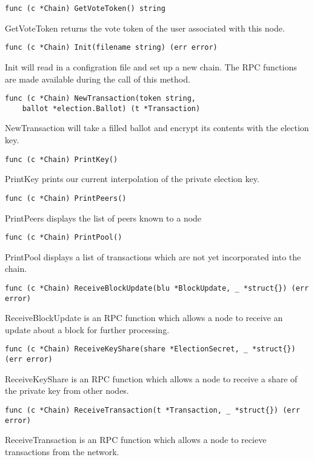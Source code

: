 \documentclass[a4paper,12pt]{article}
\begin{document}
\begin{Verbatim}[obeytabs,tabsize=4]
func (c *Chain) GetVoteToken() string
\end{Verbatim}
GetVoteToken returns the vote token of the user associated with this node.

\begin{Verbatim}[obeytabs,tabsize=4]
func (c *Chain) Init(filename string) (err error)
\end{Verbatim}
Init will read in a configration file and set up a new chain. The RPC functions are made available during the call of this method.

\begin{Verbatim}[obeytabs,tabsize=4]
func (c *Chain) NewTransaction(token string,
    ballot *election.Ballot) (t *Transaction)
\end{Verbatim}
NewTransaction will take a filled ballot and encrypt its contents with the election key.

\begin{Verbatim}[obeytabs,tabsize=4]
func (c *Chain) PrintKey()
\end{Verbatim}
PrintKey prints our current interpolation of the private election key.

\begin{Verbatim}[obeytabs,tabsize=4]
func (c *Chain) PrintPeers()
\end{Verbatim}
PrintPeers displays the list of peers known to a node

\begin{Verbatim}[obeytabs,tabsize=4]
func (c *Chain) PrintPool()
\end{Verbatim}
PrintPool displays a list of transactions which are not yet incorporated into the chain.

\begin{Verbatim}[obeytabs,tabsize=4]
func (c *Chain) ReceiveBlockUpdate(blu *BlockUpdate, _ *struct{}) (err error)
\end{Verbatim}
ReceiveBlockUpdate is an RPC function which allows a node to receive an update about a block for further processing.

\begin{Verbatim}[obeytabs,tabsize=4]
func (c *Chain) ReceiveKeyShare(share *ElectionSecret, _ *struct{}) (err error)
\end{Verbatim}
ReceiveKeyShare is an RPC function which allows a node to receive a share of the private key from other nodes.

\begin{Verbatim}[obeytabs,tabsize=4]
func (c *Chain) ReceiveTransaction(t *Transaction, _ *struct{}) (err error)
\end{Verbatim}
ReceiveTransaction is an RPC function which allows a node to recieve transactions from the network.
\end{document}
